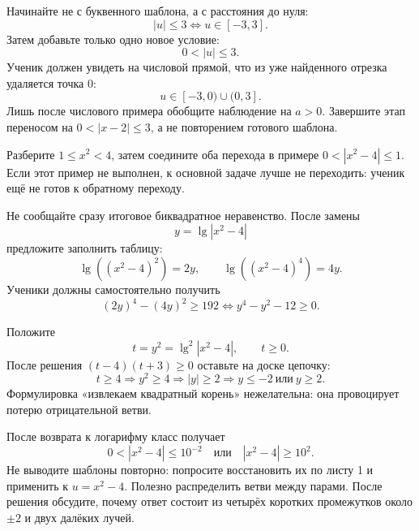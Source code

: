 \begin{teacherbox}
  Начинайте не с буквенного шаблона, а с расстояния до нуля:
  \[
    |u|\le3\Longleftrightarrow u\in[-3,3].
  \]
  Затем добавьте только одно новое условие:
  \[
    0<|u|\le3.
  \]
  Ученик должен увидеть на числовой прямой, что из уже найденного отрезка
  удаляется точка \(0\):
  \[
    u\in[-3,0)\cup(0,3].
  \]
  Лишь после числового примера обобщите наблюдение на \(a>0\). Завершите
  этап переносом на \(0<|x-2|\le3\), а не повторением готового шаблона.
\end{teacherbox}

\begin{teacherbox}
  Разберите \(1\le x^2<4\), затем соедините оба перехода в примере
  \(0<|x^2-4|\le1\). Если этот пример не выполнен, к основной задаче
  лучше не переходить: ученик ещё не готов к обратному переходу.
\end{teacherbox}

\begin{teacherbox}
  Не сообщайте сразу итоговое биквадратное неравенство. После замены
  \[
    y=\lg|x^2-4|
  \]
  предложите заполнить таблицу:
  \[
    \lg((x^2-4)^2)=2y,
    \qquad
    \lg((x^2-4)^4)=4y.
  \]
  Ученики должны самостоятельно получить
  \[
    (2y)^4-(4y)^2\ge192
    \Longleftrightarrow
    y^4-y^2-12\ge0.
  \]
\end{teacherbox}

\begin{teacherbox}
  Положите
  \[
    t=y^2=\lg^2|x^2-4|,
    \qquad t\ge0.
  \]
  После решения \((t-4)(t+3)\ge0\) оставьте на доске цепочку:
  \[
    t\ge4
    \Rightarrow y^2\ge4
    \Rightarrow |y|\ge2
    \Rightarrow y\le-2\ \text{или}\ y\ge2.
  \]
  Формулировка «извлекаем квадратный корень» нежелательна: она провоцирует
  потерю отрицательной ветви.
\end{teacherbox}

\begin{teacherbox}
  После возврата к логарифму класс получает
  \[
    0<|x^2-4|\le10^{-2}
    \quad\text{или}\quad
    |x^2-4|\ge10^2.
  \]
  Не выводите шаблоны повторно: попросите восстановить их по листу 1 и
  применить к \(u=x^2-4\). Полезно распределить ветви между парами. После
  решения обсудите, почему
  ответ состоит из четырёх коротких промежутков около \(\pm2\) и двух
  далёких лучей.
\end{teacherbox}

